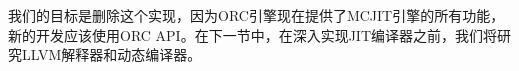 我们的目标是删除这个实现，因为ORC引擎现在提供了MCJIT引擎的所有功能，新的开发应该使用ORC API。在下一节中，在深入实现JIT编译器之前，我们将研究LLVM解释器和动态编译器。








































